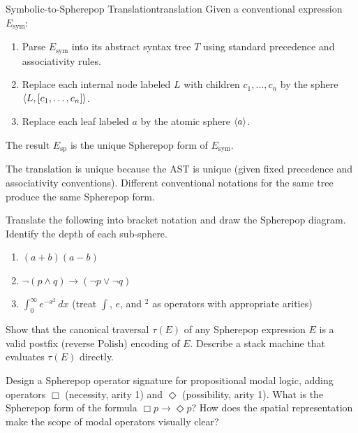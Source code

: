 \begin{definition}{Symbolic-to-Spherepop Translation}{translation}
  Given a conventional expression $E_\text{sym}$:
  \begin{enumerate}
    \item Parse $E_\text{sym}$ into its abstract syntax tree $T$
          using standard precedence and associativity rules.
    \item Replace each internal node labeled $L$ with children
          $c_1, \ldots, c_n$ by the sphere $\langle L, [c_1,\ldots,c_n] \rangle$.
    \item Replace each leaf labeled $a$ by the atomic sphere $\langle a \rangle$.
  \end{enumerate}
  The result $E_\text{sp}$ is the unique Spherepop form of $E_\text{sym}$.
\end{definition}

The translation is unique because the AST is unique (given fixed
precedence and associativity conventions). Different conventional
notations for the same tree produce the same Spherepop form.

\begin{exercise}
  Translate the following into bracket notation and draw the Spherepop
  diagram. Identify the depth of each sub-sphere.
  \begin{enumerate}[label=(\alph*)]
    \item $(a + b)(a - b)$
    \item $\neg(p \land q) \to (\neg p \lor \neg q)$
    \item $\int_0^\infty e^{-x^2}\,dx$ (treat $\int$, $e$, and ${}^2$
          as operators with appropriate arities)
  \end{enumerate}
\end{exercise}

\begin{exercise}
  Show that the canonical traversal $\tau(E)$ of any Spherepop expression
  $E$ is a valid postfix (reverse Polish) encoding of $E$. Describe
  a stack machine that evaluates $\tau(E)$ directly.
\end{exercise}

\begin{exercise}[title={Design}]
  Design a Spherepop operator signature for propositional modal logic,
  adding operators $\Box$ (necessity, arity 1) and $\Diamond$
  (possibility, arity 1). What is the Spherepop form of the formula
  $\Box p \to \Diamond p$? How does the spatial representation
  make the scope of modal operators visually clear?
\end{exercise}
